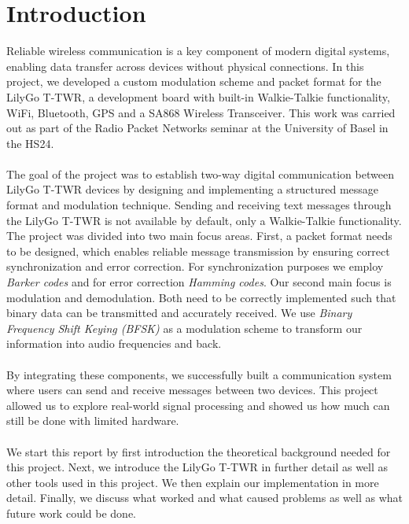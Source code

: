 \chapter{Introduction}
Reliable wireless communication is a key component of modern digital systems, enabling data transfer across devices without physical connections. In this project, we developed a custom modulation scheme and packet format for the LilyGo T-TWR, a development board with built-in Walkie-Talkie functionality, WiFi, Bluetooth, GPS and a SA868 Wireless Transceiver. This work was carried out as part of the Radio Packet Networks seminar at the University of Basel in the HS24.
\\\\
The goal of the project was to establish two-way digital communication between LilyGo T-TWR devices by designing and implementing a structured message format and modulation technique. Sending and receiving text messages through the LilyGo T-TWR is not available by default, only a Walkie-Talkie functionality. The project was divided into two main focus areas. First, a packet format needs to be designed, which enables reliable message transmission by ensuring correct synchronization and error correction. For synchronization purposes we employ \textit{Barker codes} and for error correction \textit{Hamming codes}. Our second main focus is modulation and demodulation. Both need to be correctly implemented such that binary data can be transmitted and accurately received. We use \textit{Binary Frequency Shift Keying (BFSK)} as a modulation scheme to transform our information into audio frequencies and back. %
\\ \\
By integrating these components, we successfully built a communication system where users can send and receive messages between two devices. This project allowed us to explore real-world signal processing and showed us how much can still be done with limited hardware.
\\ \\
We start this report by first introduction the theoretical background needed for this project. Next, we introduce the LilyGo T-TWR in further detail as well as other tools used in this project. We then explain our implementation in more detail. Finally, we discuss what worked and what caused problems as well as what future work could be done.